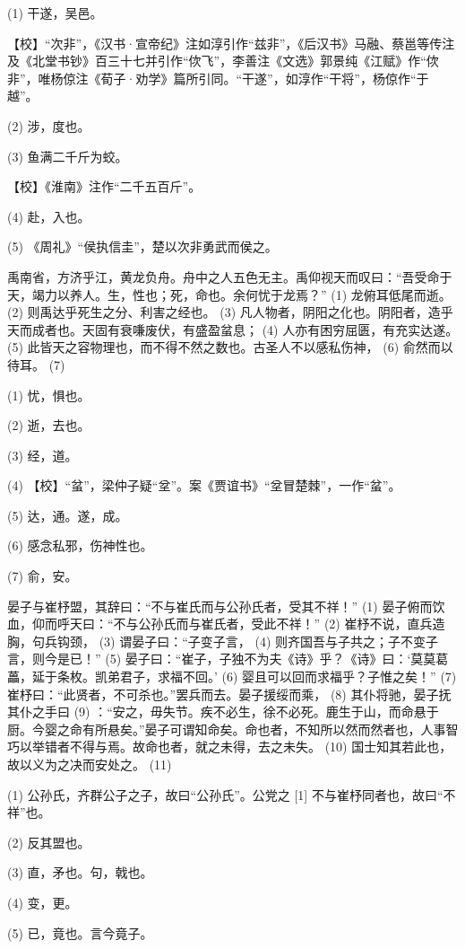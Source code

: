 \documentclass[12pt,UTF8]{ctexbook}
\begin{document}
(1) 干遂，吴邑。

【校】“次非”，《汉书·宣帝纪》注如淳引作“兹非”，《后汉书》马融、蔡邕等传注及《北堂书钞》百三十七并引作“佽飞”，李善注《文选》郭景纯《江赋》作“佽非”，唯杨倞注《荀子·劝学》篇所引同。“干遂”，如淳作“干将”，杨倞作“于越”。

(2) 涉，度也。

(3) 鱼满二千斤为蛟。

【校】《淮南》注作“二千五百斤”。

(4) 赴，入也。

(5) 《周礼》“侯执信圭”，楚以次非勇武而侯之。

禹南省，方济乎江，黄龙负舟。舟中之人五色无主。禹仰视天而叹曰：“吾受命于天，竭力以养人。生，性也；死，命也。余何忧于龙焉？” (1) 龙俯耳低尾而逝。 (2) 则禹达乎死生之分、利害之经也。 (3) 凡人物者，阴阳之化也。阴阳者，造乎天而成者也。天固有衰嗛废伏，有盛盈蚠息； (4) 人亦有困穷屈匮，有充实达遂。 (5) 此皆天之容物理也，而不得不然之数也。古圣人不以感私伤神， (6) 俞然而以待耳。 (7)

(1) 忧，惧也。

(2) 逝，去也。

(3) 经，道。

(4) 【校】“蚠”，梁仲子疑“坌”。案《贾谊书》“坌冒楚棘”，一作“蚠”。

(5) 达，通。遂，成。

(6) 感念私邪，伤神性也。

(7) 俞，安。

晏子与崔杼盟，其辞曰：“不与崔氏而与公孙氏者，受其不祥！” (1) 晏子俯而饮血，仰而呼天曰：“不与公孙氏而与崔氏者，受此不祥！” (2) 崔杼不说，直兵造胸，句兵钩颈， (3) 谓晏子曰：“子变子言， (4) 则齐国吾与子共之；子不变子言，则今是已！” (5) 晏子曰：“崔子，子独不为夫《诗》乎？《诗》曰：‘莫莫葛藟，延于条枚。凯弟君子，求福不回。’ (6) 婴且可以回而求福乎？子惟之矣！” (7) 崔杼曰：“此贤者，不可杀也。”罢兵而去。晏子援绥而乘， (8) 其仆将驰，晏子抚其仆之手曰 (9) ：“安之，毋失节。疾不必生，徐不必死。鹿生于山，而命悬于厨。今婴之命有所悬矣。”晏子可谓知命矣。命也者，不知所以然而然者也，人事智巧以举错者不得与焉。故命也者，就之未得，去之未失。 (10) 国士知其若此也，故以义为之决而安处之。 (11)

(1) 公孙氏，齐群公子之子，故曰“公孙氏”。公党之 [1] 不与崔杼同者也，故曰“不祥”也。

(2) 反其盟也。

(3) 直，矛也。句，戟也。

(4) 变，更。

(5) 已，竟也。言今竟子。
\end{document}
